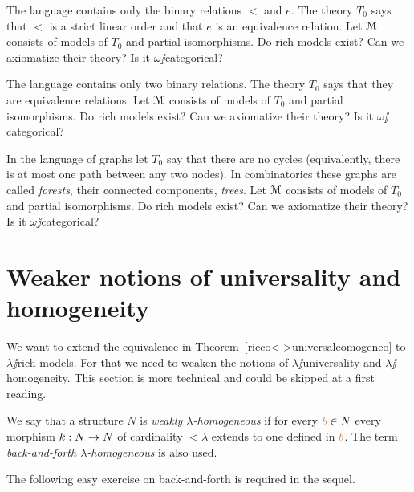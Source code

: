 \documentclass[creche.tex]{subfiles}
\begin{document}
\begin{exercise}
The language contains only the binary relations $<$ and $e$. The theory $T_0$ says that $<$ is a strict linear order and that $e$ is an equivalence relation. Let $\EuScript M$ consists of models of $T_0$ and partial isomorphisms.  Do rich models exist? Can we axiomatize their theory? Is it $\omega\jj$categorical?\QED
\end{exercise}

\begin{exercise}
The language contains only two binary relations. The theory $T_0$ says that they are equivalence relations. Let $\EuScript M$ consists of models of $T_0$ and partial isomorphisms. Do rich models exist? Can we axiomatize their theory? Is it $\omega\jj$categorical?\QED
\end{exercise}

\begin{exercise}
In the language of graphs let $T_0$ say that there are no cycles (equivalently, there is at most one path between any two nodes). In combinatorics these graphs are called \textit{forests}, their connected components, \textit{trees}. Let $\EuScript M$ consists of models of $T_0$ and partial isomorphisms. Do rich models exist? Can we axiomatize their theory? Is it $\omega\jj$categorical?\QED
\end{exercise}

\section{Weaker notions of universality and homogeneity}\label{weak}

We want to extend the equivalence in Theorem~\ref{ricco<->universaleomogeneo} to $\lambda\jj$rich models. For that we need to weaken the notions of $\lambda\jj$universality and  $\lambda\jj$homogeneity. This section is more technical and could be skipped at a first reading.

\begin{definition}
We say that a structure $N$ is \emph{weakly $\lambda$-homogeneous\/} if for every ${\color{brown} b}\in N$ every morphism $k:N\rightarrow N$ of cardinality $<\lambda$ extends to one defined in ${\color{brown} b}$. The term \emph{back-and-forth $\lambda$-homogeneous\/} is also used.\QED
\end{definition}

The following easy exercise on back-and-forth is required in the sequel.
\end{document}
